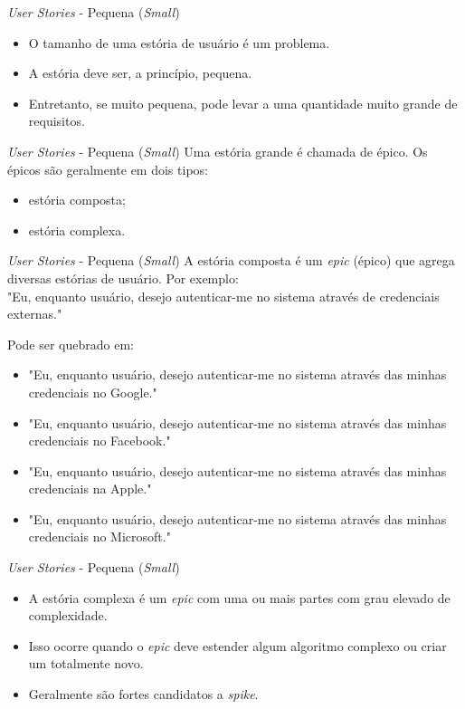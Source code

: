 \documentclass[11pt]{beamer}
\begin{document}
   \begin{frame}{\textit{User Stories} - Pequena (\textit{Small})}
      \begin{itemize}
         \item O tamanho de uma estória de usuário é um problema.
         \item A estória deve ser, a princípio, pequena.
         \item Entretanto, se muito pequena, pode levar a uma quantidade muito grande de requisitos.
      \end{itemize}
   \end{frame}

   \begin{frame}{\textit{User Stories} - Pequena (\textit{Small})}
      Uma estória grande é chamada de épico. Os épicos são geralmente em dois tipos:
      \begin{itemize}
         \item estória composta;
         \item estória complexa.
      \end{itemize}
   \end{frame}

   \begin{frame}{\textit{User Stories} - Pequena (\textit{Small})}
      A estória composta é um \textit{epic} (épico) que agrega diversas estórias de usuário. Por exemplo:\\

      "Eu, enquanto usuário, desejo autenticar-me no sistema através de credenciais externas."
\vspace{1cm}       

      Pode ser quebrado em:
      \begin{itemize}
         \item "Eu, enquanto usuário, desejo autenticar-me no sistema através das minhas credenciais no Google."
         \item "Eu, enquanto usuário, desejo autenticar-me no sistema através das minhas credenciais no Facebook."
         \item "Eu, enquanto usuário, desejo autenticar-me no sistema através das minhas credenciais na Apple."
         \item "Eu, enquanto usuário, desejo autenticar-me no sistema através das minhas credenciais no Microsoft."
      \end{itemize}
   \end{frame}

   \begin{frame}{\textit{User Stories} - Pequena (\textit{Small})}
      \begin{itemize}
         \item A estória complexa é um \textit{epic} com uma ou mais partes com grau elevado de complexidade.
         \item Isso ocorre quando o \textit{epic} deve estender algum algoritmo complexo ou criar um totalmente novo.
         \item Geralmente são fortes candidatos a \textit{spike}.
      \end{itemize}
   \end{frame}
\end{document}
